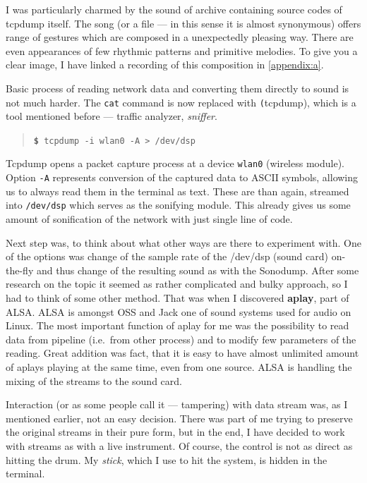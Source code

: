 \documentclass[12pt,a4paper,oneside]{report}
\begin{document}
I was particularly charmed by the sound of archive containing source codes of tcpdump itself. The song (or a file --- in this sense it is almost synonymous) offers range of gestures which are composed in a unexpectedly pleasing way. There are even appearances of few rhythmic patterns and primitive melodies. To give you a clear image, I have linked a recording of this composition in \autoref{appendix:a}.

Basic process of reading network data and converting them directly to sound is not much harder. The \texttt{cat} command is now replaced with \texttt(tcpdump), which is a tool mentioned before --- traffic analyzer, \emph{sniffer}.
\begin{quotation}
	\texttt{\textbf{\$} tcpdump -i wlan0 -A > /dev/dsp} 
\end{quotation}

Tcpdump opens a packet capture process at a device \texttt{wlan0} (wireless module). Option \texttt{-A} represents conversion of the captured data to ASCII symbols, allowing us to always read them in the terminal as text. These are than again, streamed into \texttt{/dev/dsp} which serves as the sonifying module. This already gives us some amount of sonification of the network with just single line of code. 

Next step was, to think about what other ways are there to experiment with. One of the options was change of the sample rate of the /dev/dsp (sound card) on-the-fly and thus change of the resulting sound as with the Sonodump. After some research on the topic it seemed as rather complicated and bulky approach, so I had to think of some other method. That was when I discovered \textbf{aplay}, part of ALSA. ALSA is amongst OSS and Jack one of sound systems used for audio on Linux. The most important function of aplay for me was the possibility to read data from pipeline (i.e.\ from other process) and to modify few parameters of the reading. Great addition was fact, that it is easy to have almost unlimited amount of aplays playing at the same time, even from one source. ALSA is handling the mixing of the streams to the sound card.

Interaction (or as some people call it --- tampering) with data stream was, as I mentioned earlier, not an easy decision. There was part of me trying to preserve the original streams in their pure form, but in the end, I have decided to work with streams as with a live instrument. Of course, the control is not as direct as hitting the drum. My \emph{stick}, which I use to hit the system, is hidden in the terminal. 
\end{document}
